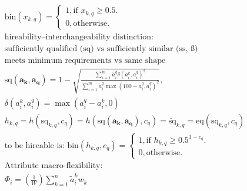\documentclass{article}
\begin{document}
\begin{gather}
    \text{bin}(x_{k,q}) = 
    \begin{cases}
        1, \text{if } x_{k,q} \geq 0.5.\\
        0, \text{otherwise.}
    \end{cases}\\
    \text{hireability--interchangeability distinction:}\\
    \text{sufficiently qualified (sq) vs sufficiently similar (ss, \ss)}\\
    \text{meets minimum requirements vs same shape}\\
    \text{sq}(\boldsymbol{a_k},\boldsymbol{a_q}) = 
    1 - 
    \sqrt{
        \frac{
            \sum_{i=1}^{m}{
                \ddot{a}_{i}^{q}
                \delta(
                    {a}_{i}^{k},
                    {a}_{i}^{q}
                ) ^ 2
            }
        }{
            \sum_{i=1}^{m}{
                \ddot{a}_{i}^{q}
                \max(
                    100 - {a}_{i}^{q}, 
                    {a}_{i}^{q}
                ) ^ 2
            }
        }
    },\\
    \delta({a}_{i}^{k}, {a}_{i}^{q}) = 
    \max({a}_{i}^{q} - {a}_{i}^{k}, 0)\\
    h_{k,q}
    = h(\text{sq}_{k,q},c_{q})
    = h(\text{sq}(\boldsymbol{a_k},\boldsymbol{a_q}),c_{q}) 
    = \ddot{\text{sq}}_{k,q}
    = \text{eq}\left(
        \text{sq}_{k,q},
        c_{q}
    \right)\\
    \text{to be hireable is: }
    \text{bin}(h_{k,q}, c_{q}) = 
    \begin{cases}
        1, \text{if } h_{k,q} \geq 0.5 ^ {1 - c_{q}}.\\
        0, \text{otherwise}.
    \end{cases}\\
    \text{Attribute macro-flexibility:}\\
    \Phi_{i} = 
    \left(\frac{1}{W}\right)
    \sum_{k=1}^{n}{
        \tilde{a}_{i}^{k}
        w_{k}
    }
\end{gather}
\end{document}
